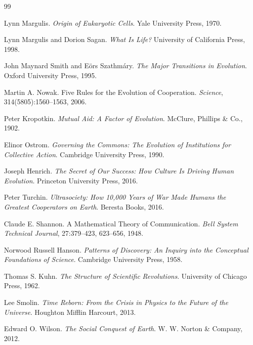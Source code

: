 \documentclass[12pt]{article}
\begin{document}
\newpage
\begin{thebibliography}{99}

Lynn Margulis.
\textit{Origin of Eukaryotic Cells}.
Yale University Press, 1970.

Lynn Margulis and Dorion Sagan.
\textit{What Is Life?}
University of California Press, 1998.

John Maynard Smith and Eörs Szathmáry.
\textit{The Major Transitions in Evolution}.
Oxford University Press, 1995.

Martin A. Nowak.
Five Rules for the Evolution of Cooperation.
\textit{Science}, 314(5805):1560--1563, 2006.

Peter Kropotkin.
\textit{Mutual Aid: A Factor of Evolution}.
McClure, Phillips \& Co., 1902.

Elinor Ostrom.
\textit{Governing the Commons: The Evolution of Institutions for Collective Action}.
Cambridge University Press, 1990.

Joseph Henrich.
\textit{The Secret of Our Success: How Culture Is Driving Human Evolution}.
Princeton University Press, 2016.

Peter Turchin.
\textit{Ultrasociety: How 10,000 Years of War Made Humans the Greatest Cooperators on Earth}.
Beresta Books, 2016.

Claude E. Shannon.
A Mathematical Theory of Communication.
\textit{Bell System Technical Journal}, 27:379--423, 623--656, 1948.

Norwood Russell Hanson.
\textit{Patterns of Discovery: An Inquiry into the Conceptual Foundations of Science}.
Cambridge University Press, 1958.

Thomas S. Kuhn.
\textit{The Structure of Scientific Revolutions}.
University of Chicago Press, 1962.

Lee Smolin.
\textit{Time Reborn: From the Crisis in Physics to the Future of the Universe}.
Houghton Mifflin Harcourt, 2013.

Edward O. Wilson.
\textit{The Social Conquest of Earth}.
W. W. Norton \& Company, 2012.

\end{thebibliography}
\end{document}
